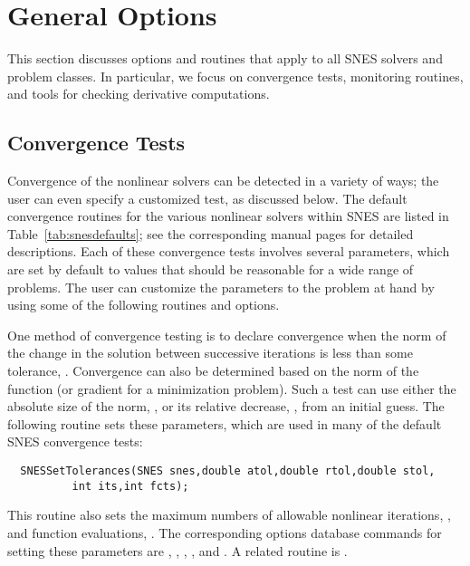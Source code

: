 \section{General Options}

This section discusses options and routines that apply to all SNES
solvers and problem classes.  In particular, we focus on convergence
tests, monitoring routines, and tools for checking derivative
computations.

\subsection{Convergence Tests}
\label{sec:snesconvergence}

Convergence of the nonlinear solvers can be detected in a variety of
ways; the user can even specify a customized test, as discussed
below.  The default convergence routines for
the various nonlinear solvers within SNES are listed in
Table~\ref{tab:snesdefaults}; see the corresponding manual pages for
detailed descriptions.  Each of these convergence tests involves
several parameters, which are set by default to values that should be
reasonable for a wide range of problems.  The user can customize the
parameters to the problem at hand by using some of the following
routines and options.

One method of convergence testing is
to declare convergence when the norm of the change in the solution
between successive iterations is less than some tolerance, .
Convergence can also be determined based on the norm of the function
(or gradient for a minimization problem).  
Such a test can use either the absolute size of the
norm, , or its relative decrease, , from an initial
guess.  The following routine sets these parameters, which are used
in many of the default SNES convergence tests: 
\begin{verbatim}
  SNESSetTolerances(SNES snes,double atol,double rtol,double stol,
          int its,int fcts);
\end{verbatim}
This routine also sets the maximum numbers of allowable
nonlinear iterations, , and function evaluations, .
The corresponding options database commands for setting these parameters
are , , ,
   
 
, and .
A related routine is . 

